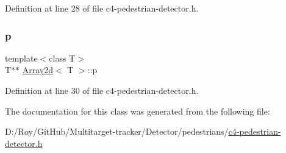 Definition at line 28 of file c4-\/pedestrian-\/detector.\+h.

\mbox{\label{class_array2d_ac7b70bc423364c43c7c174cdde515380}} 
\subsubsection{\texorpdfstring{p}{p}}
{\footnotesize\ttfamily template$<$class T$>$ \\
T$\ast$$\ast$ \mbox{\hyperlink{class_array2d}{Array2d}}$<$ T $>$\+::p}



Definition at line 30 of file c4-\/pedestrian-\/detector.\+h.



The documentation for this class was generated from the following file\+:\begin{DoxyCompactItemize}
\item 
D\+:/\+Roy/\+Git\+Hub/\+Multitarget-\/tracker/\+Detector/pedestrians/\mbox{\hyperlink{c4-pedestrian-detector_8h}{c4-\/pedestrian-\/detector.\+h}}\end{DoxyCompactItemize}
